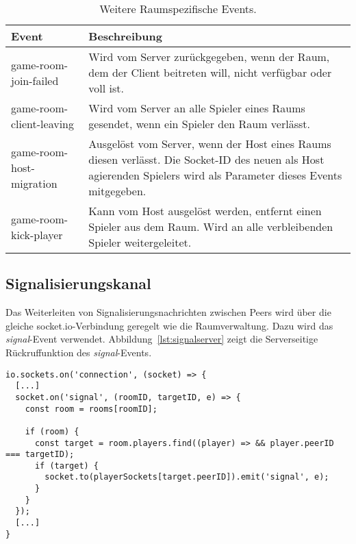\begin{table}[ht]
\centering
\begin{tabularx}{\textwidth}{lX}
\toprule
Event&Beschreibung\\

\midrule
game-room-join-failed&Wird vom Server zurückgegeben, wenn der Raum, dem der Client beitreten will, nicht verfügbar oder voll ist.\\
game-room-client-leaving&Wird vom Server an alle Spieler eines Raums gesendet, wenn ein Spieler den Raum verlässt.\\
game-room-host-migration&Ausgelöst vom Server, wenn der Host eines Raums diesen verlässt. Die Socket-ID des neuen als Host agierenden Spielers wird als Parameter dieses Events mitgegeben.\\
game-room-kick-player&Kann vom Host ausgelöst werden, entfernt einen Spieler aus dem Raum. Wird an alle verbleibenden Spieler weitergeleitet.\\
\bottomrule

\end{tabularx}
\caption{Weitere Raumspezifische Events.}
\label{table:otherevents}
\end{table}

\subsection{Signalisierungskanal}
\label{section:signalisierungskanal}
Das Weiterleiten von Signalisierungsnachrichten zwischen Peers wird über die gleiche socket.io-Verbindung geregelt wie die Raumverwaltung. Dazu wird das \textit{signal}-Event verwendet. Abbildung~\ref{lst:signalserver} zeigt die Serverseitige Rückruffunktion des \textit{signal}-Events.

\lstset{language=js, style=STYLE_CODE_JS}
\begin{singlespace}
\begin{minipage}{\textwidth}
\begin{lstlisting}[caption={Event zum Weiterleiten eines Signals -- Server.js}, captionpos=b, label={lst:signalserver}]
io.sockets.on('connection', (socket) => {
  [...]
  socket.on('signal', (roomID, targetID, e) => {
    const room = rooms[roomID];

    if (room) {
      const target = room.players.find((player) => && player.peerID === targetID);
      if (target) {
        socket.to(playerSockets[target.peerID]).emit('signal', e);
      }
    }
  });
  [...]
}
\end{lstlisting}
\end{minipage}
\end{singlespace}


